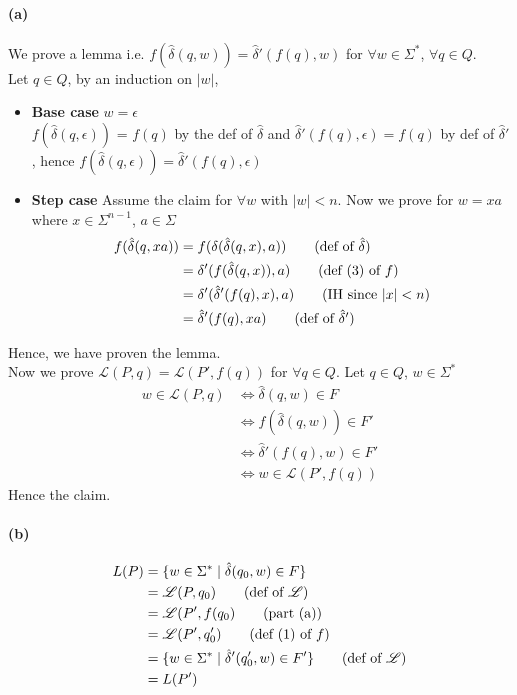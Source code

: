 \documentclass[12pt]{article}
\begin{document}
\paragraph*{(a)} We prove a lemma i.e. \(f(\hat{\delta}(q, w)) = \hat{\delta}'(f(q), w)\) for \(\forall w \in \Sigma^*\), \(\forall q \in Q\).\\
Let \(q \in Q\), by an induction on \(|w|\),
\begin{itemize}
  \item \textbf{Base case} \(w = \epsilon\)\\
  \(f(\hat{\delta}(q, \epsilon))\) = \(f(q)\) by the def of \(\hat{\delta}\) and \(\hat{\delta}'(f(q), \epsilon) = f(q)\) by def of \(\hat{\delta}'\), hence \(f(\hat{\delta}(q, \epsilon)) = \hat{\delta}'(f(q), \epsilon)\)
  \item \textbf{Step case} Assume the claim for \(\forall w\) with \(|w| < n\). Now we prove for \(w = xa\) where \(x \in \Sigma^{n-1}\), \(a \in \Sigma\)
  \begin{align*}
    f(\hat{\delta}(q, xa)) &= f(\delta(\hat{\delta}(q, x), a)) \tag*{(def of \(\hat{\delta})\)}\\
    &= \delta'(f(\hat{\delta}(q, x)), a) \tag*{(def (3) of \(f\))}\\
    &= \delta'(\hat{\delta}'(f(q), x), a) \tag*{(IH since \(|x| < n\))}\\
    &= \hat{\delta}'(f(q), xa) \tag*{(def of \(\hat{\delta}'\))}
  \end{align*}
\end{itemize}
Hence, we have proven the lemma.\\
Now we prove \(\mathscr{L}(P, q) = \mathscr{L}(P', f(q))\) for \(\forall q \in Q\). Let \(q \in Q\), \(w \in \Sigma^*\)
\begin{align*}
  w \in \mathscr{L}(P, q) &\Leftrightarrow \hat{\delta}(q, w) \in F \\ 
  &\Leftrightarrow f(\hat{\delta}(q, w)) \in F' \tag*{(def (2) of \(f\))}\\
  &\Leftrightarrow \hat{\delta}'(f(q), w) \in F' \tag*{(lemma)} \\
  &\Leftrightarrow w \in \mathscr{L}(P', f(q))
\end{align*}
Hence the claim.

\paragraph*{(b)} 
\begin{align*}
  L(P) &= \{w \in \Sigma^* \mid \hat{\delta}(q_0, w) \in F\}\\
  &= \mathscr{L}(P, q_0) \tag*{(def of \(\mathscr{L}\))}\\
  &= \mathscr{L}(P', f(q_0) \tag*{(part (a))}\\
  &= \mathscr{L}(P', q'_0) \tag*{(def (1) of \(f\))}\\
  &= \{w \in \Sigma^* \mid \hat{\delta}'(q'_0, w) \in F'\} \tag*{(def of \(\mathscr{L}\))}\\
  &= L(P')
\end{align*}
\end{document}
